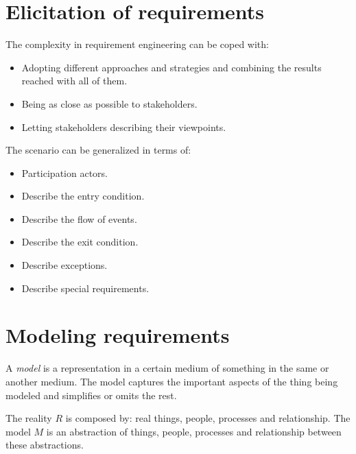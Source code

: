 \documentclass[12pt, a4paper]{report}
\begin{document}
    \section{Elicitation of requirements}
    The complexity in requirement engineering can be coped with:
    \begin{itemize}
        \item Adopting different approaches and strategies and combining the results reached with all of them.
        \item Being as close as possible to stakeholders.
        \item Letting stakeholders describing their viewpoints.
    \end{itemize}
    The scenario can be generalized in terms of:
    \begin{itemize}
        \item Participation actors.
        \item Describe the entry condition.
        \item Describe the flow of events.
        \item Describe the exit condition.
        \item Describe exceptions.
        \item Describe special requirements.
    \end{itemize}

    \section{Modeling requirements}
    \begin{definition}
        A \emph{model} is a representation in a certain medium of something in the same or another medium. The model captures the important aspects of the thing being modeled and 
        simplifies or omits the rest. 
    \end{definition}
    The reality $R$ is composed by: real things, people, processes and relationship. The model $M$ is an abstraction of things, people, processes and relationship between these 
    abstractions. 
     
\end{document}
